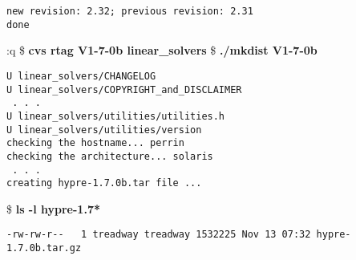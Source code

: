 \begin{ttfamily}
\begin{mdseries}
\begin{verbatim}
new revision: 2.32; previous revision: 2.31
done
\end{verbatim}
:q
\$ \textbf{cvs rtag V1-7-0b linear\_solvers}\linebreak
\$ \textbf{./mkdist V1-7-0b}\linebreak
\begin{verbatim}
U linear_solvers/CHANGELOG
U linear_solvers/COPYRIGHT_and_DISCLAIMER
 . . .
U linear_solvers/utilities/utilities.h
U linear_solvers/utilities/version
checking the hostname... perrin
checking the architecture... solaris
 . . .
creating hypre-1.7.0b.tar file ...
\end{verbatim}
\$ \textbf{ls -l hypre-1.7*}\linebreak
\begin{verbatim}
-rw-rw-r--   1 treadway treadway 1532225 Nov 13 07:32 hypre-1.7.0b.tar.gz


\end{verbatim}
\end{mdseries}
\end{ttfamily}
